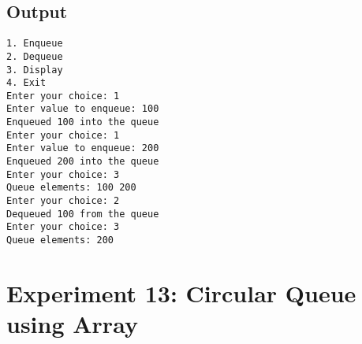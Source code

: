 \documentclass[12pt,a4paper]{article}
\begin{document}
\subsection*{Output}
\begin{tcolorbox}[terminalstyle, title=Sample Output]
\texttt{1. Enqueue\\2. Dequeue\\3. Display\\4. Exit\\
Enter your choice: 1\\
Enter value to enqueue: 100\\
Enqueued 100 into the queue\\
Enter your choice: 1\\
Enter value to enqueue: 200\\
Enqueued 200 into the queue\\
Enter your choice: 3\\
Queue elements: 100 200\\
Enter your choice: 2\\
Dequeued 100 from the queue\\
Enter your choice: 3\\
Queue elements: 200}
\end{tcolorbox}

\newpage
\section*{Experiment 13: Circular Queue using Array}
\end{document}
